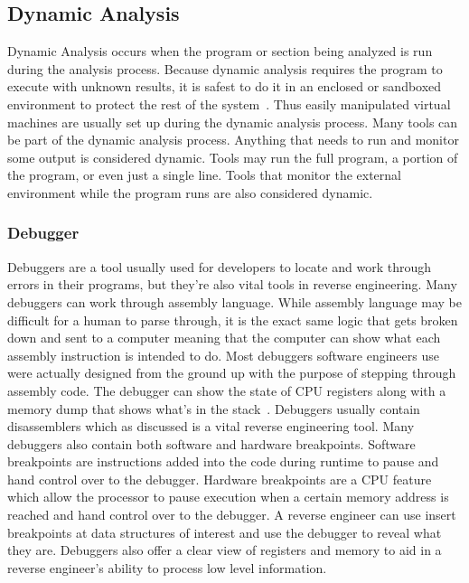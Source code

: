 \documentclass[12pt]{article}
\begin{document}
\subsection{Dynamic Analysis}
Dynamic Analysis occurs when the program or section being analyzed is run during the analysis process. Because dynamic analysis requires the program to execute with unknown results, it is safest to do it in an enclosed or sandboxed environment to protect the rest of the system~\cite{MasteringRE}. Thus easily manipulated virtual machines are usually set up during the dynamic analysis process. Many tools can be part of the dynamic analysis process. Anything that needs to run and monitor some output is considered dynamic. Tools may run the full program, a portion of the program, or even just a single line. Tools that monitor the external environment while the program runs are also considered dynamic.

\subsubsection{Debugger}
Debuggers are a tool usually used for developers to locate and work through errors in their programs, but they’re also vital tools in reverse engineering. Many debuggers can work through assembly language. While assembly language may be difficult for a human to parse through, it is the exact same logic that gets broken down and sent to a computer meaning that the computer can show what each assembly instruction is intended to do. Most debuggers software engineers use were actually designed from the ground up with the purpose of stepping through assembly code. The debugger can show the state of CPU registers along with a memory dump that shows what’s in the stack~\cite{Reversing}. Debuggers usually contain disassemblers which as discussed is a vital reverse engineering tool. Many debuggers also contain both software and hardware breakpoints. Software breakpoints are instructions added into the code during runtime to pause and hand control over to the debugger. Hardware breakpoints are a CPU feature which allow the processor to pause execution when a certain memory address is reached and hand control over to the debugger. A reverse engineer can use insert breakpoints at data structures of interest and use the debugger to reveal what they are. Debuggers also offer a clear view of registers and memory to aid in a reverse engineer's ability to process low level information.
\end{document}
